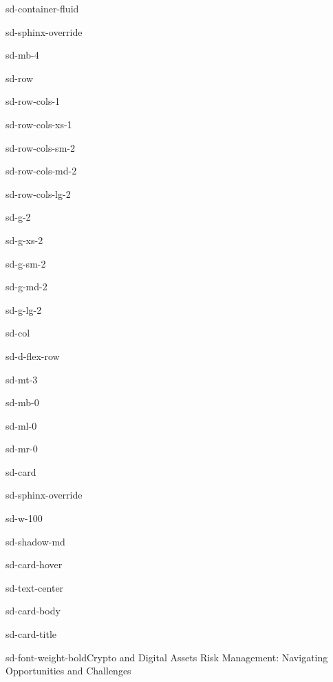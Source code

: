 \documentclass[letterpaper,10pt,english]{jupyterBook}
\begin{document}
\begin{sphinxuseclass}{sd-container-fluid}
\begin{sphinxuseclass}{sd-sphinx-override}
\begin{sphinxuseclass}{sd-mb-4}
\begin{sphinxuseclass}{sd-row}
\begin{sphinxuseclass}{sd-row-cols-1}
\begin{sphinxuseclass}{sd-row-cols-xs-1}
\begin{sphinxuseclass}{sd-row-cols-sm-2}
\begin{sphinxuseclass}{sd-row-cols-md-2}
\begin{sphinxuseclass}{sd-row-cols-lg-2}
\begin{sphinxuseclass}{sd-g-2}
\begin{sphinxuseclass}{sd-g-xs-2}
\begin{sphinxuseclass}{sd-g-sm-2}
\begin{sphinxuseclass}{sd-g-md-2}
\begin{sphinxuseclass}{sd-g-lg-2}
\begin{sphinxuseclass}{sd-col}
\begin{sphinxuseclass}{sd-d-flex-row}
\begin{sphinxuseclass}{sd-mt-3}
\begin{sphinxuseclass}{sd-mb-0}
\begin{sphinxuseclass}{sd-ml-0}
\begin{sphinxuseclass}{sd-mr-0}
\begin{sphinxuseclass}{sd-card}
\begin{sphinxuseclass}{sd-sphinx-override}
\begin{sphinxuseclass}{sd-w-100}
\begin{sphinxuseclass}{sd-shadow-md}
\begin{sphinxuseclass}{sd-card-hover}
\begin{sphinxuseclass}{sd-text-center}
\begin{sphinxuseclass}{sd-card-body}
\begin{sphinxuseclass}{sd-card-title}
\begin{sphinxuseclass}{sd-font-weight-bold}Crypto and Digital Assets Risk Management: Navigating Opportunities and Challenges
\end{sphinxuseclass}
\end{sphinxuseclass}




\end{sphinxuseclass}
\end{sphinxuseclass}
\end{sphinxuseclass}
\end{sphinxuseclass}
\end{sphinxuseclass}
\end{sphinxuseclass}
\end{sphinxuseclass}
\end{sphinxuseclass}
\end{sphinxuseclass}
\end{sphinxuseclass}
\end{sphinxuseclass}
\end{sphinxuseclass}
\end{sphinxuseclass}
\end{sphinxuseclass}
\end{sphinxuseclass}
\end{sphinxuseclass}
\end{sphinxuseclass}
\end{sphinxuseclass}
\end{sphinxuseclass}
\end{sphinxuseclass}
\end{sphinxuseclass}
\end{sphinxuseclass}
\end{sphinxuseclass}
\end{sphinxuseclass}
\end{sphinxuseclass}
\end{sphinxuseclass}
\end{sphinxuseclass}
\sphinxstepscope
\end{document}
